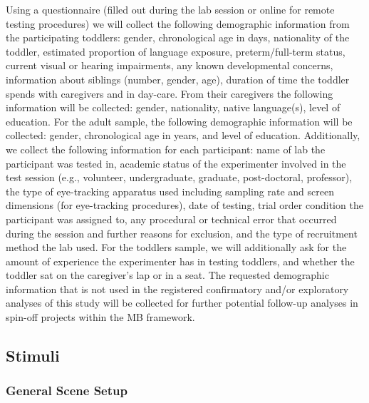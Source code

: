 \documentclass[
  man, donotrepeattitle,floatsintext]{apa6}
\begin{document}
Using a questionnaire (filled out during the lab session or online for remote testing procedures) we will collect the following demographic information from the participating toddlers: gender, chronological age in days, nationality of the toddler, estimated proportion of language exposure, preterm/full-term status, current visual or hearing impairments, any known developmental concerns, information about siblings (number, gender, age), duration of time the toddler spends with caregivers and in day-care. From their caregivers the following information will be collected: gender, nationality, native language(s), level of education. For the adult sample, the following demographic information will be collected: gender, chronological age in years, and level of education.
Additionally, we collect the following information for each participant: name of lab the participant was tested in, academic status of the experimenter involved in the test session (e.g., volunteer, undergraduate, graduate, post-doctoral, professor), the type of eye-tracking apparatus used including sampling rate and screen dimensions (for eye-tracking procedures), date of testing, trial order condition the participant was assigned to, any procedural or technical error that occurred during the session and further reasons for exclusion, and the type of recruitment method the lab used. For the toddlers sample, we will additionally ask for the amount of experience the experimenter has in testing toddlers, and whether the toddler sat on the caregiver's lap or in a seat. The requested demographic information that is not used in the registered confirmatory and/or exploratory analyses of this study will be collected for further potential follow-up analyses in spin-off projects within the MB framework.

\subsection{Stimuli}\label{stimuli}

\subsubsection{General Scene Setup}\label{general-scene-setup}
\end{document}
